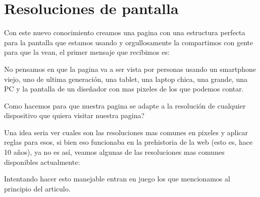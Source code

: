\documentclass[letterpaper,10pt,spanish]{sphinxmanual}
\begin{document}
\section{Resoluciones de pantalla}
\label{\detokenize{filas-columnas:resoluciones-de-pantalla}}
Con este nuevo conocimiento creamos una pagina con una estructura perfecta
para la pantalla que estamos usando y orgullosamente la compartimos con gente
para que la vean, el primer mensaje que recibimos es:

%
\begin{sphinxVerbatim}[commandchars=\\\{\}]
               
\end{sphinxVerbatim}

No pensamos en que la pagina va a ser vista por personas usando un smartphone
viejo, uno de ultima generación, una tablet, una laptop chica, una grande,
una PC y la pantalla de un diseñador con mas pixeles de los que podemos contar.

Como hacemos para que nuestra pagina se adapte a la resolución de cualquier
dispositivo que quiera visitar nuestra pagina?

Una idea seria ver cuales son las resoluciones mas comunes en pixeles y aplicar
reglas para esos, si bien eso funcionaba en la prehistoria de la web (esto es,
hace 10 años), ya no es así, veamos algunas de las resoluciones mas comunes
disponibles actualmente:

\begin{figure}[htbp]
\centering

\noindent{}
\end{figure}

Intentando hacer esto manejable entran en juego los  que
mencionamos al principio del articulo.
\end{document}
